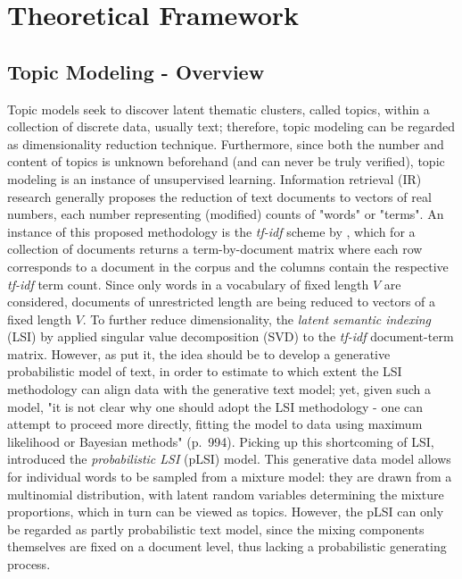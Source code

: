 \documentclass[12pt]{article}
\begin{document}
\section{Theoretical Framework}

\subsection{Topic Modeling - Overview}

Topic models seek to discover latent thematic clusters, called topics, within a collection of discrete data, usually text; therefore, topic modeling can be regarded as dimensionality reduction technique. Furthermore, since both the number and content of topics is unknown beforehand (and can never be truly verified), topic modeling is an instance of unsupervised learning. Information retrieval (IR) research generally proposes the reduction of text documents to vectors of real numbers, each number representing (modified) counts of "words" or "terms". An instance of this proposed methodology is the \textit{tf-idf} scheme by \cite{salton1983information}, which for a collection of documents returns a term-by-document matrix where each row corresponds to a document in the corpus and the columns contain the respective \textit{tf-idf} term count. Since only words in a vocabulary of fixed length $V$ are considered, documents of unrestricted length are being reduced to vectors of a fixed length $V$. To further reduce dimensionality, the \textit{latent semantic indexing} (LSI) by \cite{deerwester1990indexing} applied singular value decomposition (SVD) to the \textit{tf-idf} document-term matrix. However, as \cite{blei2003latent} put it, the idea should be to develop a generative probabilistic model of text, in order to estimate to which extent the LSI methodology can align data with the generative text model; yet, given such a model, "it is not clear why one should adopt the LSI methodology - one can attempt to proceed more directly, fitting the model to data using maximum likelihood or Bayesian methods" (p.\ 994). Picking up this shortcoming of LSI, \cite{hofmann1999probabilistic} introduced the \textit{probabilistic LSI} (pLSI) model. This generative data model allows for individual words to be sampled from a mixture model: they are drawn from a multinomial distribution, with latent random variables determining the mixture proportions, which in turn can be viewed as topics. However, the pLSI can only be regarded as partly probabilistic text model, since the mixing components themselves are fixed on a document level, thus lacking a probabilistic generating process.
\end{document}
